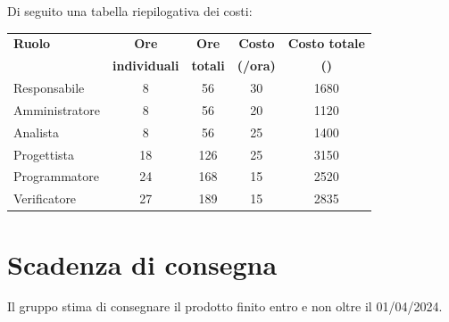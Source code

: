 \documentclass[12pt]{article}
\begin{document}
	\noindent Di seguito una tabella riepilogativa dei costi:
	\newline\newline
	\begin{tabularx}{\textwidth}{|X|c|c|c|c|}
		\hline \rowcolor{gray!20}
		\textbf{Ruolo} & \textbf{Ore}         & \textbf{Ore}    & \textbf{Costo}            & \textbf{Costo totale} \\ \rowcolor{gray!20}
		& \textbf{individuali} & \textbf{totali} & \textbf{(\texteuro/ora)}  & \textbf{(\texteuro)}  \\
		\hline\hline
		Responsabile & 8 & 56 & 30 & 1680\\
		\hline
		Amministratore  & 8 & 56 & 20 & 1120\\
		\hline
		Analista & 8 & 56 & 25 & 1400\\
		\hline
		Progettista & 18 & 126 & 25 & 3150\\
		\hline
		Programmatore & 24 & 168 & 15 & 2520\\
		\hline
		Verificatore & 27 & 189 &  15 & 2835\\
		\hline
	\end{tabularx}
	
	\section{Scadenza di consegna}
	Il gruppo stima di consegnare il prodotto finito entro e non oltre il 01/04/2024.
\end{document}
